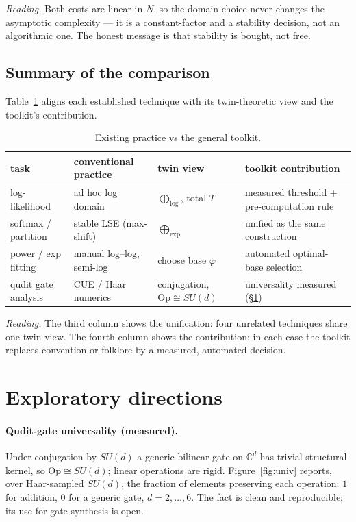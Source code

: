 \documentclass[11pt,a4paper]{article}
\newcommand{\Op}{\mathrm{Op}}
\newcommand{\C}{\mathbb{C}}
\theoremstyle{definition}
\begin{document}
\noindent\emph{Reading.} Both costs are linear in $N$, so the domain choice
never changes the asymptotic complexity --- it is a constant-factor and a
stability decision, not an algorithmic one. The honest message is that stability
is bought, not free.

\subsection{Summary of the comparison}

Table~\ref{tab:compare} aligns each established technique with its twin-theoretic
view and the toolkit's contribution.

\begin{table}[ht]
\centering
\caption{Existing practice vs the general toolkit.}
\label{tab:compare}
\begin{tabular}{p{3.0cm}p{3.2cm}p{2.8cm}p{4.0cm}}
\toprule
task & conventional practice & twin view & toolkit contribution \\
\midrule
log-likelihood & ad hoc log domain & $\bigoplus_{\log}$, total $T$ &
measured threshold + pre-computation rule \\
softmax / partition & stable LSE (max-shift) & $\bigoplus_{\exp}$ &
unified as the same construction \\
power / exp fitting & manual log--log, semi-log & choose base $\varphi$ &
automated optimal-base selection \\
qudit gate analysis & CUE / Haar numerics & conjugation, $\Op\cong SU(d)$ &
universality measured (\S\ref{sec:explore}) \\
\bottomrule
\end{tabular}
\end{table}

\noindent\emph{Reading.} The third column shows the unification: four unrelated
techniques share one twin view. The fourth column shows the contribution: in
each case the toolkit replaces convention or folklore by a measured, automated
decision.

\section{Exploratory directions}
\label{sec:explore}

\paragraph{Qudit-gate universality (measured).} Under conjugation by $SU(d)$ a
generic bilinear gate on $\C^d$ has trivial structural kernel, so
$\Op\cong SU(d)$; linear operations are rigid. Figure~\ref{fig:univ} reports,
over Haar-sampled $SU(d)$, the fraction of elements preserving each operation:
$1$ for addition, $0$ for a generic gate, $d=2,\dots,6$. The fact is clean and
reproducible; its use for gate synthesis is open.
\end{document}

